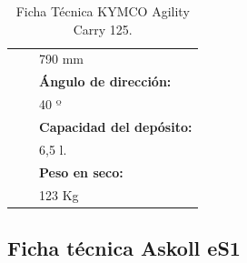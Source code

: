 \begin{table}[H]
\begin{tabular}{lll}
\textbf{}                                    &  & 790 mm                                          \\
                                             &  & \textbf{Ángulo de dirección:}                   \\
\textbf{}                                    &  & 40 º                                            \\
\textbf{}                                    &  & \textbf{Capacidad del depósito:}                \\
\textbf{}                                    &  & 6,5 l.                                          \\
\textbf{}                                    &  & \textbf{Peso en seco:}                          \\
\textbf{}                                    &  & 123 Kg                                         
\end{tabular}
\caption{Ficha Técnica KYMCO Agility Carry 125.}
\label{tab: ficha tecnica KYMCO}
\end{table}




\subsection{Ficha técnica Askoll eS1}
\label{subanexo: ficha tecnica askill es1}

